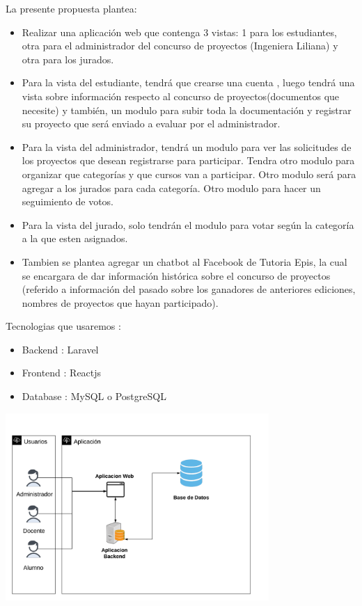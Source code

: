 \documentclass[%
 reprint,
 amsmath,amssymb,
 aps,
]{revtex4-1}
\begin{document}
La presente propuesta plantea:
\begin{itemize}
    \item Realizar una aplicación web que contenga 3 vistas: 1 para los estudiantes, otra para el administrador del concurso de proyectos (Ingeniera Liliana) y otra para los jurados.
     \item Para la vista del estudiante, tendrá que crearse una cuenta , luego tendrá una vista sobre información respecto al concurso de proyectos(documentos que necesite) y también, un modulo para subir toda la documentación y registrar su proyecto que será enviado a evaluar por el administrador.
     \item Para la vista del administrador, tendrá un modulo para ver las solicitudes de los proyectos que desean registrarse para participar. Tendra otro modulo para organizar que categorías y que cursos van a participar. Otro modulo será para agregar a los jurados para cada categoría. Otro modulo para hacer un seguimiento de votos. 
    \item Para la vista del jurado, solo tendrán el modulo para votar según la categoría a la que esten asignados.
    \item Tambien se plantea agregar un chatbot al Facebook de Tutoria Epis, la cual se encargara de dar información histórica sobre el concurso de proyectos (referido a información del pasado sobre los ganadores de anteriores ediciones, nombres de proyectos que hayan participado).
\end{itemize}
\newpage
Tecnologias que usaremos :
\begin{itemize}
\item Backend : Laravel
\item Frontend : Reactjs
\item Database : MySQL o PostgreSQL
\end{itemize}
\begin{center}
\includegraphics[width=10cm]{./Imagenes/qa}
\end{center}
\end{document}
